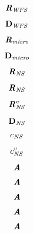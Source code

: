 \documentclass[10pt]{report}
\begin{document}
\begin{equation*}
\Pos[mat][WFS]
\end{equation*}

\begin{equation*}
\Diag[vec][WFS]
\end{equation*}

\begin{equation*}
\Pos[mat][micro]
\end{equation*}

\begin{equation*}
\Diag[vec][micro]
\end{equation*}

\begin{equation*}
\Pos[mat][NS]
\end{equation*}

\begin{equation*}
\Pos[mat][NS]
\end{equation*}

\begin{equation*}
\Pos[mat][NS]<virtual>
\end{equation*}

\begin{equation*}
\Diag[vec][NS]
\end{equation*}

\begin{equation*}
\coef[scalar][NS]
\end{equation*}

\begin{equation*}
\coef[scalar][NS]<virtual>
\end{equation*}

\begin{equation*}
\bm{\mathit{A}}
\end{equation*}

\begin{equation*}
\bm{\mathit{A}}
\end{equation*}

\begin{equation*}
\bm{\mathit{A}}
\end{equation*}

\begin{equation*}
\bm{\mathit{A}}
\end{equation*}

\begin{equation*}
\bm{\mathit{A}}
\end{equation*}
\end{document}

